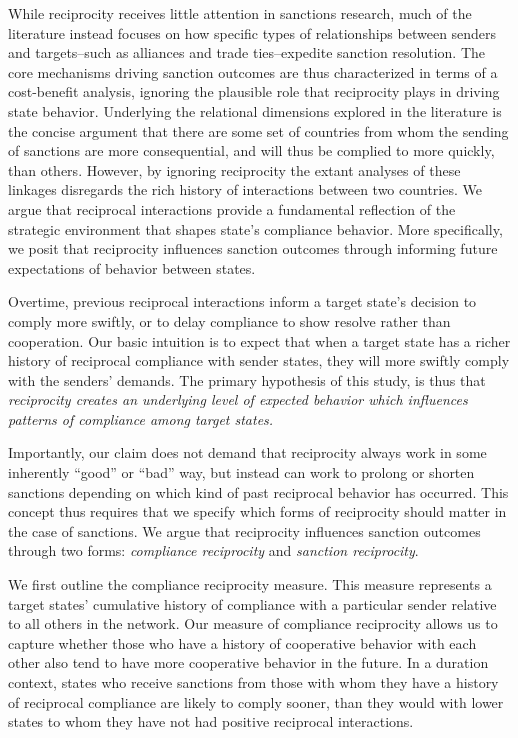 While reciprocity receives little attention in sanctions research, much of the literature instead focuses on how specific types of relationships between senders and targets--such as alliances and trade ties--expedite sanction resolution. The core mechanisms driving sanction outcomes are thus characterized in terms of a cost-benefit analysis, ignoring the plausible role that reciprocity plays in driving state behavior. Underlying the relational dimensions explored in the literature is the concise argument that there are some set of countries from whom the sending of sanctions are more consequential, and will thus be complied to more quickly, than others. However, by ignoring reciprocity the extant analyses of these linkages disregards the rich history of interactions between two countries. We argue that reciprocal interactions provide a fundamental reflection of the strategic environment that shapes state's compliance behavior. More specifically, we posit that reciprocity influences sanction outcomes through informing future expectations of behavior between states. 

Overtime, previous reciprocal interactions inform a target state's decision to comply more swiftly, or to delay compliance to show resolve rather than cooperation. Our basic intuition is to expect that when a target state has a richer history of reciprocal compliance with sender states, they will more swiftly comply with the senders' demands. The primary hypothesis of this study, is thus that \textit{reciprocity creates an underlying level of expected behavior which influences patterns of compliance among target states.}

Importantly, our claim does not demand that reciprocity always work in some inherently ``good'' or ``bad'' way, but instead can work to prolong or shorten sanctions depending on which kind of past reciprocal behavior has occurred. This concept thus requires that we specify which forms of reciprocity should matter in the case of sanctions. We argue that reciprocity influences sanction outcomes through two forms: \textit{compliance reciprocity} and \textit{sanction reciprocity}. 



We first outline the compliance reciprocity measure. This measure represents a target states' cumulative history of compliance with a particular sender relative to all others in the network. Our measure of compliance reciprocity allows us to capture whether those who have a history of cooperative behavior with each other also tend to have more cooperative behavior in the future. In a duration context, states who receive sanctions from those with whom they have a history of reciprocal compliance are likely to comply sooner, than they would with lower states to whom they have not had positive reciprocal interactions. 

